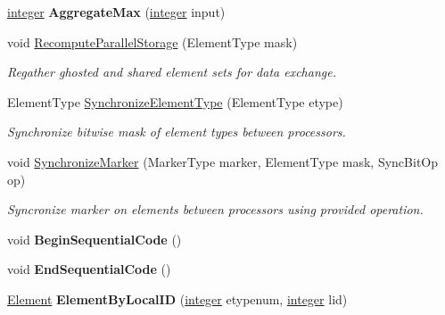 \begin{DoxyCompactItemize}
\item 
\hypertarget{classINMOST_1_1Mesh_a473a5c93ff000e34b8c07eb1ec9947a1}{\hyperlink{classINMOST_1_1Storage_aec96942bc647417a801e2895b45964d2}{integer} {\bfseries Aggregate\-Max} (\hyperlink{classINMOST_1_1Storage_aec96942bc647417a801e2895b45964d2}{integer} input)}\label{classINMOST_1_1Mesh_a473a5c93ff000e34b8c07eb1ec9947a1}

\item 
void \hyperlink{classINMOST_1_1Mesh_a5691f394480da7e21c5099e313df03e0}{Recompute\-Parallel\-Storage} (Element\-Type mask)
\begin{DoxyCompactList}\small\item\em Regather ghosted and shared element sets for data exchange. \end{DoxyCompactList}\item 
Element\-Type \hyperlink{classINMOST_1_1Mesh_a9c3acf2a90e25699a64e1f7b4125eaf7}{Synchronize\-Element\-Type} (Element\-Type etype)
\begin{DoxyCompactList}\small\item\em Synchronize bitwise mask of element types between processors. \end{DoxyCompactList}\item 
void \hyperlink{classINMOST_1_1Mesh_a8c7a825072f54b260caa0e8da8877647}{Synchronize\-Marker} (Marker\-Type marker, Element\-Type mask, Sync\-Bit\-Op op)
\begin{DoxyCompactList}\small\item\em Syncronize marker on elements between processors using provided operation. \end{DoxyCompactList}\item 
\hypertarget{classINMOST_1_1Mesh_aecf9564fe8f57e292e7c2267fbe588d6}{void {\bfseries Begin\-Sequential\-Code} ()}\label{classINMOST_1_1Mesh_aecf9564fe8f57e292e7c2267fbe588d6}

\item 
\hypertarget{classINMOST_1_1Mesh_aa4f44fe4031bbe9b68ae0764f4b6d43a}{void {\bfseries End\-Sequential\-Code} ()}\label{classINMOST_1_1Mesh_aa4f44fe4031bbe9b68ae0764f4b6d43a}

\item 
\hypertarget{classINMOST_1_1Mesh_aedac2611fffd95b7cd20ed9540c743fa}{\hyperlink{classINMOST_1_1Element}{Element} {\bfseries Element\-By\-Local\-I\-D} (\hyperlink{classINMOST_1_1Storage_aec96942bc647417a801e2895b45964d2}{integer} etypenum, \hyperlink{classINMOST_1_1Storage_aec96942bc647417a801e2895b45964d2}{integer} lid)}\label{classINMOST_1_1Mesh_aedac2611fffd95b7cd20ed9540c743fa}


\end{DoxyCompactItemize}

